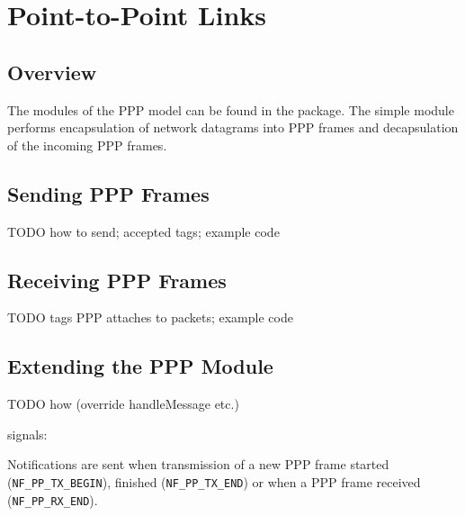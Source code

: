 \chapter{Point-to-Point Links}
\label{cha:ppp}


\section{Overview}

The modules of the PPP model can be found in the 
package. The  simple module performs encapsulation
of network datagrams into PPP frames and decapsulation of
the incoming PPP frames.

\section{Sending PPP Frames}

TODO how to send; accepted tags; example code

\section{Receiving PPP Frames}

TODO tags PPP attaches to packets; example code

\section{Extending the PPP Module}

TODO how (override handleMessage etc.)

signals:

Notifications are sent when
transmission of a new PPP frame started (\verb!NF_PP_TX_BEGIN!), finished
(\verb!NF_PP_TX_END!) or when a PPP frame received (\verb!NF_PP_RX_END!).





